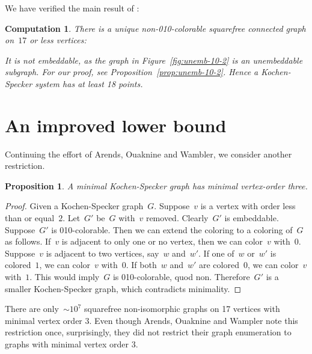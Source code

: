 \documentclass[adraft,copyright,creativecommons]{eptcs}
\newcounter{main}
\newtheorem{prop}[main]{Proposition}
\newtheorem{comp}[main]{Computation}
\theoremstyle{definition}
\theoremstyle{remark}
\begin{document}
We have verified the main result of \cite{aow11}:
\begin{comp}
There is a unique non-010-colorable squarefree connected graph on~$17$ or less
vertices:
\begin{center}
\end{center}
It is not embeddable, as the graph in Figure~\ref{fig:unemb-10-2}
is an unembeddable subgraph.  For our proof,
see Proposition~\ref{prop:unemb-10-2}.
Hence a Kochen-Specker
system has at least 18 points.
\end{comp}

\section{An improved lower bound}
\label{sec:ilb}
Continuing the effort of Arends, Ouaknine and Wambler,
we consider another restriction.
\begin{prop}
    A minimal Kochen-Specker graph has minimal vertex-order three.
\end{prop}
\begin{proof}
    Given a Kochen-Specker graph~$G$.
    Suppose~$v$ is a vertex with order less than or equal~$2$.
    Let~$G'$ be~$G$ with~$v$ removed.
    Clearly~$G'$ is embeddable.
    Suppose~$G'$ is 010-colorable.
    Then we can extend the coloring to a coloring of~$G$ as follows.
    If~$v$ is adjacent to only one or no vertex,
    then we can color~$v$ with~$0$.
    Suppose~$v$ is adjacent to two vertices, say~$w$ and~$w'$.
    If one of~$w$ or~$w'$ is colored~$1$, we can color~$v$ with~$0$.
    If both~$w$ and~$w'$ are colored~$0$, we can color~$v$ with~$1$.
    This would imply~$G$ is 010-colorable, quod non.
    Therefore~$G'$ is a smaller
    Kochen-Specker graph, which contradicts minimality.
\end{proof}
There are only~${\sim}10^7$
squarefree non-isomorphic graphs on 17 vertices with minimal vertex order 3.
Even though Arends, Ouaknine and Wampler
note this restriction once,
surprisingly, they did not restrict their graph enumeration
to graphs with minimal vertex order 3.
\end{document}
